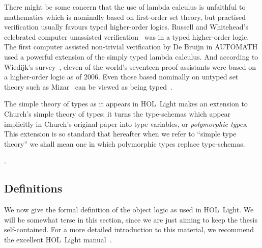 There might be some concern that the use of lambda calculus is unfaithful to mathematics which is nominally based on first-order set theory, but  practised verification usually favours typed higher-order logics. Russell and Whitehead's celebrated computer unassisted verification~\cite{Principia} was in a typed higher-order logic. The first computer assisted non-trivial verification by De Bruijn in AUTOMATH used a powerful extension of the simply typed lambda calculus. And according to Wiedijk's survey~\cite{SeventeenProvers}, eleven of the world's seventeen proof assistants were based on a higher-order logic as of 2006. Even those based nominally on untyped set theory such as Mizar~\cite{MizarMathematicalVernacular} can be viewed as being typed~\cite{MizarSoftTypes}.


The simple theory of types as it appears in HOL~Light makes an extension to Church's simple theory of types: it turns the type-schemas which appear implicitly in Church's original paper into type variables, or \emph{polymorphic types}. This extension is so standard that hereafter when we refer to ``simple type theory'' we shall mean one in which polymorphic types replace type-schemas.

.

\subsection{Definitions}\label{sec:ObjectLogicFormal}
We now give the formal definition of the object logic as used in HOL~Light. We will be somewhat terse in this section, since we are just aiming to keep the thesis self-contained. For a more detailed introduction to this material, we recommend the excellent HOL~Light manual~\cite{HOLLightManual}.

